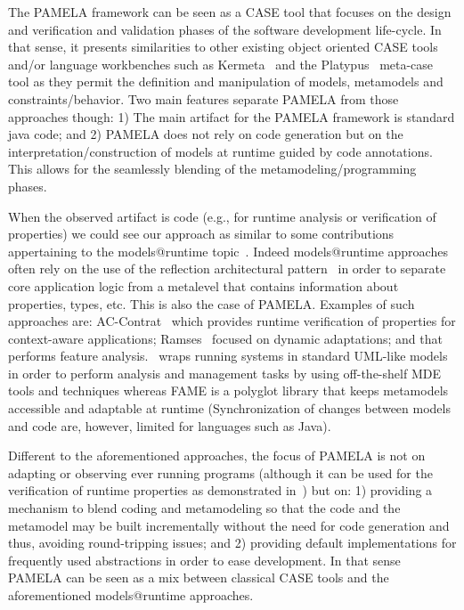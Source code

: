 The PAMELA framework can be seen as a CASE tool that focuses on the design and verification and validation phases of the software development life-cycle. In that sense, it presents similarities to other existing object oriented CASE tools and/or language workbenches such as Kermeta~\cite{kermeta} and the Platypus~\cite{platypus} meta-case tool as they permit the definition and manipulation of models, metamodels and constraints/behavior. Two main features separate PAMELA from those approaches though: 1) The main artifact for the PAMELA framework is standard java code; and 2) PAMELA does not rely on code generation but on the interpretation/construction of models at runtime guided by code annotations. This allows for the seamlessly blending of the metamodeling/programming phases.

When the observed artifact is code (e.g., for runtime analysis or verification of properties) we could see our approach as similar to some contributions appertaining to the models@runtime topic~\cite{bencomo2019models}. Indeed models@runtime approaches often rely  on the use of the reflection architectural pattern~\cite{buschmann2008pattern} in order to separate core application logic from a metalevel that contains information about properties, types, etc. This is also the case of PAMELA. 
Examples of such approaches are: AC-Contrat~\cite{accontract} which provides runtime verification of properties for context-aware applications; Ramses~\cite{ramses} focused on dynamic adaptations; and \cite{denker2010modeling} that performs feature analysis.~\cite{song2010applying} wraps running systems in standard UML-like models in order to perform analysis and management tasks by using off-the-shelf MDE tools and techniques whereas FAME \cite{kuhn2008fame} is a polyglot library that keeps metamodels accessible and adaptable at runtime (Synchronization of changes between models and code are, however, limited for languages such as Java).

Different to the aforementioned approaches, the focus of PAMELA is not on adapting or observing ever running programs (although it can be used for the verification of runtime properties as demonstrated in~\cite{silva20}) but on: 1) providing a mechanism to blend coding and metamodeling so that the code and the metamodel may be built incrementally without the need for code generation and thus, avoiding round-tripping issues; and 2) providing default implementations for frequently used abstractions in order to ease development. In that sense PAMELA can be seen as a mix between classical CASE tools and the aforementioned models@runtime approaches.

